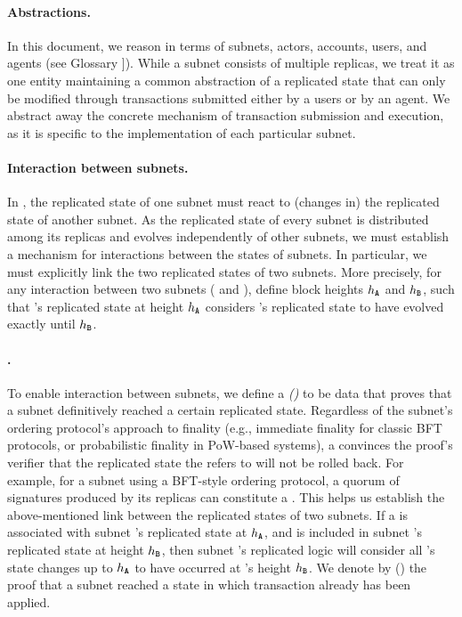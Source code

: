 \paragraph{Abstractions.}
In this document, we reason in terms of subnets, actors, accounts, users, and \ipc agents (see Glossary \cite{glossary}]).
While a subnet consists of multiple replicas, we treat it as one entity maintaining a common abstraction of a replicated state
that can only be modified through transactions submitted either by a users or by an \ipc agent.
We abstract away the concrete mechanism of transaction submission and execution, as it is specific to the implementation of each particular subnet.

\paragraph{Interaction between subnets.}
In \ipc, the replicated state of one subnet must react to (changes in) the replicated state of another subnet.
As the replicated state of every subnet is distributed among its replicas and evolves independently of other subnets,
we must establish a mechanism for interactions between the states of subnets.
In particular, we must explicitly link the two replicated states of two subnets.
More precisely, for any interaction between two subnets ( and ), define block heights $h_{\textbf{\texttt{A}}}$ and $h_{\textbf{\texttt{B}}}$,
such that 's replicated state at height $h_{\textbf{\texttt{A}}}$ considers 's replicated state to have evolved exactly until $h_{\textbf{\texttt{B}}}$.

\paragraph{\pofsFull.}
To enable interaction between subnets, we define a \emph{\pofFull (\pof)} to be data that proves that a subnet definitively reached a certain replicated state.
Regardless of the subnet's ordering protocol's approach to finality (e.g., immediate finality for classic BFT protocols, or probabilistic finality in PoW-based systems),
a \pof convinces the proof's verifier that the replicated state the \pof refers to will not be rolled back.
For example, for a subnet using a BFT-style ordering protocol, a quorum of signatures produced by its replicas can constitute a \pof.
This helps us establish the above-mentioned link between the replicated states of two subnets.
If a \pof is associated with subnet 's replicated state at $h_{\textbf{\texttt{A}}}$,
and \pof is included in subnet 's replicated state at height $h_{\textbf{\texttt{B}}}$,
then subnet 's replicated logic will consider all 's state changes up to $h_{\textbf{\texttt{A}}}$
to have occurred at 's height $h_{\textbf{\texttt{B}}}$.
We denote by \pof\unskip() the proof that a subnet reached a state in which transaction  already has been applied.

